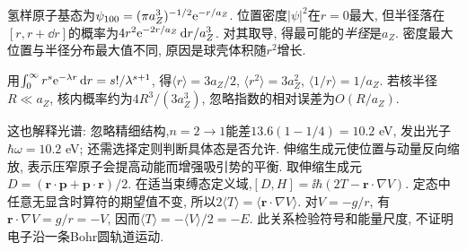 氢样原子基态为$\psi_{100}=(\pi a_Z^3)^{-1/2}\mathrm e^{-r/a_Z}$. 位置密度$|\psi|^2$在$r=0$最大, 但半径落在$[r,r+\dd r]$的概率为$4r^2\mathrm e^{-2r/a_Z}\,\mathrm d r/a_Z^3$. 对其取导, 得最可能的\emph{半径}是$a_Z$. 密度最大位置与半径分布最大值不同, 原因是球壳体积随$r^2$增长.

用$\int_0^\infty r^s\mathrm e^{-\lambda r}\,\mathrm d r=s!/\lambda^{s+1}$, 得$\langle r\rangle=3a_Z/2$, $\langle r^2\rangle=3a_Z^2$, $\langle1/r\rangle=1/a_Z$. 若核半径$R\ll a_Z$, 核内概率约为$4R^3/(3a_Z^3)$, 忽略指数的相对误差为$O(R/a_Z)$.

这也解释光谱: 忽略精细结构,$n=2\to1$能差$13.6(1-1/4)=10.2$ eV, 发出光子$\hbar\omega=10.2$ eV; 还需选择定则判断具体态是否允许. 伸缩生成元使位置与动量反向缩放, 表示压窄原子会提高动能而增强吸引势的平衡. 取伸缩生成元$D=(\boldsymbol r\cdot\boldsymbol p+\boldsymbol p\cdot\boldsymbol r)/2$. 在适当束缚态定义域,$[D,H]=\ii\hbar(2T-\boldsymbol r\cdot\nabla V)$. 定态中任意无显含时算符的期望值不变, 所以$2\langle T\rangle=\langle\boldsymbol r\cdot\nabla V\rangle$. 对$V=-g/r$, 有$\boldsymbol r\cdot\nabla V=g/r=-V$, 因而$\langle T\rangle=-\langle V\rangle/2=-E$. 此关系检验符号和能量尺度, 不证明电子沿一条Bohr圆轨道运动.
